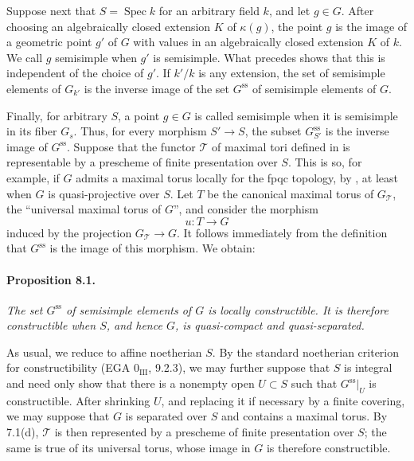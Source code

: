Suppose next that \(S=\operatorname{Spec}k\) for an arbitrary field
\(k\), and let \(g\in G\). After choosing an algebraically closed
extension \(K\) of \(\kappa(g)\), the point \(g\) is the image of a
geometric point \(g'\) of \(G\) with values in an algebraically
closed extension \(K\) of \(k\). We call \(g\) semisimple when \(g'\)
is semisimple. What precedes shows that this is independent of the
choice of \(g'\). If \(k'/k\) is any extension, the set of
semisimple elements of \(G_{k'}\) is the inverse image of the set
\(G^{\mathrm{ss}}\) of semisimple elements of \(G\).

Finally, for arbitrary \(S\), a point \(g\in G\) is called
semisimple when it is semisimple in its fiber \(G_s\). Thus, for
every morphism \(S'\to S\), the subset \(G^{\mathrm{ss}}_{S'}\) is
the inverse image of \(G^{\mathrm{ss}}\). Suppose that the functor
\(\mathcal T\) of maximal tori defined in  is representable by a
prescheme of finite presentation over \(S\). This is so, for
example, if \(G\) admits a maximal torus locally for the fpqc
topology, by , at least when \(G\) is quasi-projective over
\(S\). Let \(T\) be the canonical maximal torus of
\(G_{\mathcal T}\), the ``universal maximal torus of \(G\)'', and
consider the morphism
\[
  u:T\longrightarrow G
\]
induced by the projection \(G_{\mathcal T}\to G\). It follows
immediately from the definition that \(G^{\mathrm{ss}}\) is the
image of this morphism. We obtain:

\paragraph{\textbf{Proposition 8.1.}}
\emph{The set \(G^{\mathrm{ss}}\) of semisimple elements of \(G\)
is locally constructible. It is therefore constructible when \(S\),
and hence \(G\), is quasi-compact and quasi-separated.}

As usual, we reduce to affine noetherian \(S\). By the standard
noetherian criterion for constructibility (EGA \(0_{\mathrm{III}}\),
9.2.3), we may further suppose that \(S\) is integral and need only
show that there is a nonempty open \(U\subset S\) such that
\(G^{\mathrm{ss}}|_U\) is constructible. After shrinking \(U\), and
replacing it if necessary by a finite covering, we may suppose that
\(G\) is separated over \(S\) and contains a maximal torus. By
7.1(d), \(\mathcal T\) is then represented by a prescheme of finite
presentation over \(S\); the same is true of its universal torus,
whose image in \(G\) is therefore constructible.

